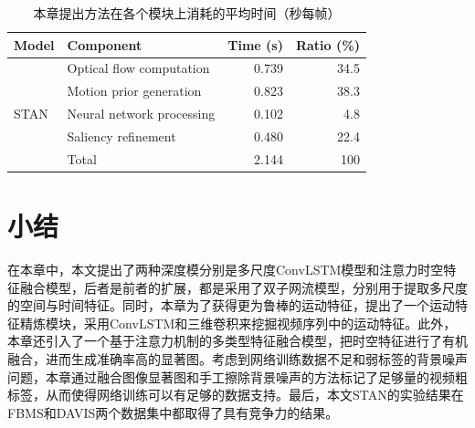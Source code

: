 \begin{table}
\centering
\caption{本章提出方法在各个模块上消耗的平均时间（秒每帧）}
\renewcommand{\arraystretch}{1.0}
\begin{tabular}{ |l|l|r|r| }
\hline
\hline
Model & Component & Time (s) & Ratio (\%)\\ \hline
\multirow{5}{*}{STAN} & Optical flow computation & 0.739 & 34.5\\
 & Motion prior generation & 0.823 & 38.3\\
 & Neural network processing & 0.102 & 4.8\\
 & Saliency refinement & 0.480 & 22.4\\\cline{2-4}
 & Total & 2.144 & 100\\ \hline

\end{tabular}
\label{table5}
\end{table}
\section{小结}
在本章中，本文提出了两种深度模分别是多尺度ConvLSTM模型和注意力时空特征融合模型，后者是前者的扩展，都是采用了双子网流模型，分别用于提取多尺度的空间与时间特征。同时，本章为了获得更为鲁棒的运动特征，提出了一个运动特征精炼模块，采用ConvLSTM和三维卷积来挖掘视频序列中的运动特征。此外，本章还引入了一个基于注意力机制的多类型特征融合模型，把时空特征进行了有机融合，进而生成准确率高的显著图。考虑到网络训练数据不足和弱标签的背景噪声问题，本章通过融合图像显著图和手工擦除背景噪声的方法标记了足够量的视频粗标签，从而使得网络训练可以有足够的数据支持。最后，本文STAN的实验结果在FBMS和DAVIS两个数据集中都取得了具有竞争力的结果。